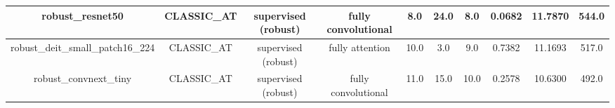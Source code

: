 \begin{table}[ht]
{\begin{tabular}{|c|c|c|c|c|c|c|c|c|c|}
\hline
                  robust\_resnet50 & CLASSIC\_AT &     supervised (robust) & fully convolutional &                 8.0 &               24.0 &                      8.0 &               0.0682 &             11.7870 &                     544.0 \\
\hline
 robust\_deit\_small\_patch16\_224 & CLASSIC\_AT &     supervised (robust) &     fully attention &                10.0 &                3.0 &                      9.0 &               0.7382 &             11.1693 &                     517.0 \\
\hline
            robust\_convnext\_tiny & CLASSIC\_AT &     supervised (robust) & fully convolutional &                11.0 &               15.0 &                     10.0 &               0.2578 &             10.6300 &                     492.0 \\
\hline
\hline
\hline
\end{tabular}
}
\end{table}